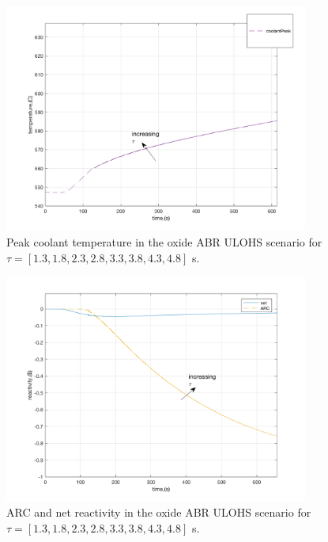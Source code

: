 \documentclass[11pt, oneside]{article}   	%
\begin{document}
\begin{figure}[h!]
\includegraphics[width=10cm]{ULOHS_peak}
\centering
\caption{Peak coolant temperature in the oxide ABR ULOHS scenario for $\tau=[1.3, 1.8, 2.3, 2.8, 3.3, 3.8, 4.3, 4.8]$ s.}
\label{fig:ULOHS_peak}
\end{figure}

\begin{figure}[h!]
\includegraphics[width=10cm]{ULOHS_rho}
\centering
\caption{ARC and net reactivity in the oxide ABR ULOHS scenario for $\tau=[1.3, 1.8, 2.3, 2.8, 3.3, 3.8, 4.3, 4.8]$ s.}
\label{fig:ULOHS_rho}
\end{figure}

\end{document}
